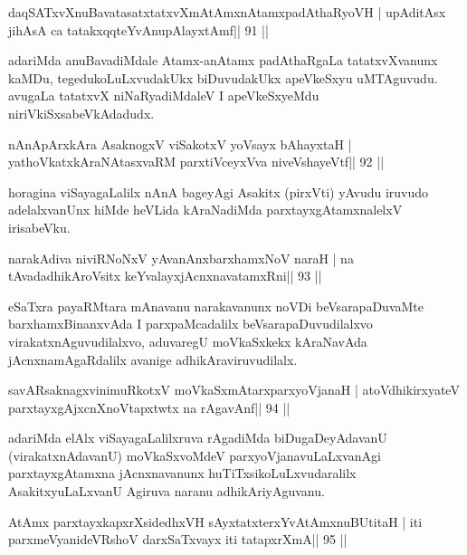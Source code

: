 \begin{shl}
daqSATxvX\s nuBavatasatxtatxvXmAtAmxnAtamxpadAthaRyoVH |
upAditAsx jihAsA ca tatakxqqteYvAnupAlayxtAmf\hfill || 91 ||
\end{shl}

\begin{artha}
adariMda anuBavadiMdale Atamx-anAtamx padAthaRgaLa tatatxvXvanunx kaMDu, tegedukoLuLxvudakUkx biDuvudakUkx apeVkeSxyu uMTAguvudu. avugaLa tatatxvX niNaRyadiMdaleV I apeVkeSxyeMdu niriVkiSxsabeVkAdadudx.
\end{artha}

\begin{shl}
nAnApArxkAra AsaknogxV viSakotxV yoV\s sayx bAhayxtaH |
yathoVkatxkAraNAtasxvaRM parxtiVceyxVva niveVshayeVtf\hfill || 92 ||
\end{shl}

\begin{artha}
horagina viSayagaLalilx nAnA bageyAgi Asakitx (pirxVti) yAvudu iruvudo adelalxvanUnx hiMde heVLida kAraNadiMda parxtayxgAtamxnalelxV irisabeVku.
\end{artha}

\begin{shl}
narakAdiva niviRNoNxV yAvanAnx\s\s  barxhamxNoV naraH |
na tAvadadhikAroV\s sitx keYvalayxjAcnxnavatamxRni\hfill || 93 ||
\end{shl}

\begin{artha}
eSaTxra payaRMtara mAnavanu narakavanunx noVDi beVsarapaDuvaMte barxhamxBinanxvAda I parxpaMcadalilx beVsarapaDuvudilalxvo virakatxnAguvudilalxvo, aduvaregU moVkaSxkekx kAraNavAda jAcnxnamAgaRdalilx avanige adhikAraviruvudilalx.
\end{artha}

\begin{shl}
savARsaknagxvinimuRkotxV moVkaSxmAtarxparxyoVjanaH |
atoV\s dhikirxyateV parxtayxgAjxcnXnoVtapxtwtx na rAgavAnf\hfill || 94 ||
\end{shl}

\begin{artha}
adariMda elAlx viSayagaLalilxruva rAgadiMda biDugaDeyAdavanU (virakatxnAdavanU) moVkaSxvoMdeV parxyoVjanavuLaLxvanAgi parxtayxgAtamxna jAcnxnavanunx huTiTxsikoLuLxvudaralilx AsakitxyuLaLxvanU Agiruva naranu adhikAriyAguvanu.
\end{artha}

\begin{shl}
AtAmx parxtayxkapxrXsidedhxVH sAyxtatxterxYvA\s\s tAmxnuBUtitaH |
iti parxmeVyanideVRshoV darxSaTxvayx iti tatapxrXmA\hfill || 95 ||
\end{shl}

